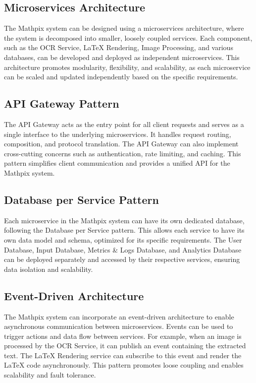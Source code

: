 \documentclass{article}
\begin{document}
\subsection{Microservices Architecture}
The Mathpix system can be designed using a microservices architecture, where the system is decomposed into smaller, loosely coupled services. Each component, such as the OCR Service, LaTeX Rendering, Image Processing, and various databases, can be developed and deployed as independent microservices. This architecture promotes modularity, flexibility, and scalability, as each microservice can be scaled and updated independently based on the specific requirements.

\subsection{API Gateway Pattern}
The API Gateway acts as the entry point for all client requests and serves as a single interface to the underlying microservices. It handles request routing, composition, and protocol translation. The API Gateway can also implement cross-cutting concerns such as authentication, rate limiting, and caching. This pattern simplifies client communication and provides a unified API for the Mathpix system.

\subsection{Database per Service Pattern}
Each microservice in the Mathpix system can have its own dedicated database, following the Database per Service pattern. This allows each service to have its own data model and schema, optimized for its specific requirements. The User Database, Input Database, Metrics \& Logs Database, and Analytics Database can be deployed separately and accessed by their respective services, ensuring data isolation and scalability.

\subsection{Event-Driven Architecture}
The Mathpix system can incorporate an event-driven architecture to enable asynchronous communication between microservices. Events can be used to trigger actions and data flow between services. For example, when an image is processed by the OCR Service, it can publish an event containing the extracted text. The LaTeX Rendering service can subscribe to this event and render the LaTeX code asynchronously. This pattern promotes loose coupling and enables scalability and fault tolerance.
\end{document}
